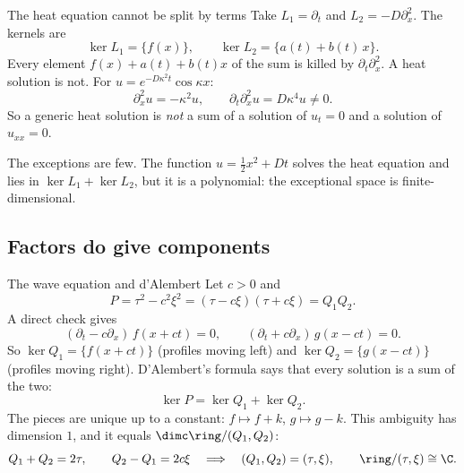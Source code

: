 \begin{example}{The heat equation cannot be split by terms}
Take $L_1=\partial_t$ and $L_2=-D\partial_x^2$. The kernels are
\[
\ker L_1=\{f(x)\},\qquad \ker L_2=\{a(t)+b(t)\,x\}.
\]
Every element $f(x)+a(t)+b(t)x$ of the sum is killed by $\partial_t\partial_x^2$. A heat solution is not. For $u=e^{-D\kappa^2t}\cos\kappa x$:
\[
\partial_x^2u=-\kappa^2u,\qquad \partial_t\partial_x^2u=D\kappa^4u\neq0 .
\]
So a generic heat solution is \emph{not} a sum of a solution of $u_t=0$ and a solution of $u_{xx}=0$.

The exceptions are few. The function $u=\tfrac12x^2+Dt$ solves the heat equation and lies in $\ker L_1+\ker L_2$, but it is a polynomial: the exceptional space is finite-dimensional.
\end{example}

\subsection{Factors do give components}

\begin{example}{The wave equation and d'Alembert}\label{ex:wave}
Let $c>0$ and
\[
P=\tau^2-c^2\xi^2=(\tau-c\xi)(\tau+c\xi)=Q_1Q_2 .
\]
A direct check gives
\[
(\partial_t-c\partial_x)\,f(x+ct)=0,\qquad (\partial_t+c\partial_x)\,g(x-ct)=0 .
\]
So $\ker Q_1=\{f(x+ct)\}$ (profiles moving left) and $\ker Q_2=\{g(x-ct)\}$ (profiles moving right). D'Alembert's formula says that every solution is a sum of the two:
\[
\ker P=\ker Q_1+\ker Q_2 .
\]
The pieces are unique up to a constant: $f\mapsto f+k$, $g\mapsto g-k$. This ambiguity has dimension $1$, and it equals $\dimc\ring/(Q_1,Q_2)$:
\[
Q_1+Q_2=2\tau,\qquad Q_2-Q_1=2c\xi\quad\Longrightarrow\quad(Q_1,Q_2)=(\tau,\xi),\qquad \ring/(\tau,\xi)\cong\C .
\]
\end{example}

